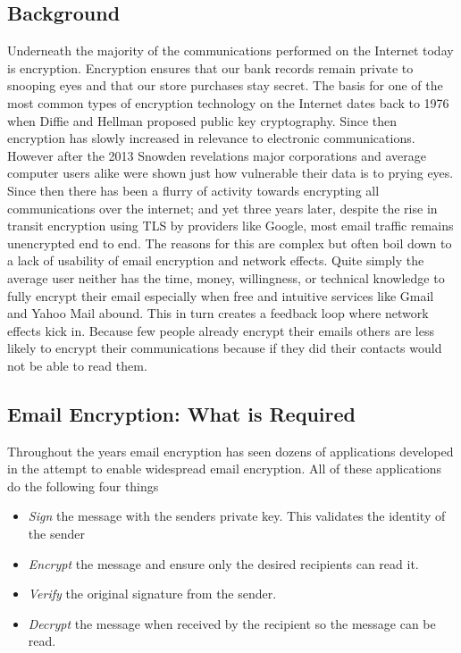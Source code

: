 \documentclass[10pt]{article}
\begin{document}
\begin{multicols}{2}
\section{Background}
\par Underneath the majority of the communications performed on the Internet today is encryption. Encryption ensures that our bank records remain private to snooping eyes and that our store purchases stay secret. The basis for one of the most common types of encryption technology on the Internet dates back to 1976 when Diffie and Hellman proposed public key cryptography. Since then encryption has slowly increased in relevance to electronic communications. However after the 2013 Snowden revelations major corporations and average computer users alike were shown just how vulnerable their data is to prying eyes. Since then there has been a flurry of activity towards encrypting all communications over the internet\cite{wired-encrypted-traffic}; and yet three years later, despite the rise in transit encryption using TLS by providers like Google\cite{gmail-tls-report}, most email traffic remains unencrypted end to end. The reasons for this are complex but often boil down to a lack of usability of email encryption and network effects. Quite simply the average user neither has the time, money, willingness, or technical knowledge to fully encrypt their email especially when free and intuitive services like Gmail and Yahoo Mail abound\cite{garfinkel2005make}. This in turn creates a feedback loop where network effects kick in. Because few people already encrypt their emails others are less likely to encrypt their communications because if they did their contacts would not be able to read them\cite{dingledine2006anonymity}.

\subsection{Email Encryption: What is Required}
Throughout the years email encryption has seen dozens of applications developed in the attempt to enable widespread email encryption. All of these applications do the following four things

\begin{itemize}
  \item \textit{Sign} the message with the senders private key. This validates the identity of the sender
  \item \textit{Encrypt} the message and ensure only the desired recipients can read it.
  \item \textit{Verify} the original signature from the sender.
  \item \textit{Decrypt} the message when received by the recipient so the message can be read.
\end{itemize}


\end{multicols}
\end{document}

